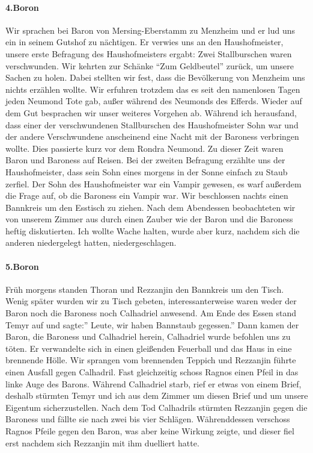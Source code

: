 \paragraph{4.Boron}
Wir sprachen bei Baron von Mersing-Eberstamm zu Menzheim und er lud uns ein in seinem Gutshof zu nächtigen. Er verwies uns an den Haushofmeister, unsere erste Befragung des Haushofmeisters ergabt: Zwei Stallburschen waren verschwunden. Wir kehrten zur Schänke ``Zum Geldbeutel'' zurück, um unsere Sachen zu holen. Dabei stellten wir fest, dass die Bevölkerung von Menzheim uns nichts erzählen wollte. Wir erfuhren trotzdem das es seit den namenlosen Tagen jeden Neumond Tote gab, außer während des Neumonds des Efferds. Wieder auf dem Gut besprachen wir unser weiteres Vorgehen ab.
Während ich herausfand, dass einer der verschwundenen Stallburschen des Haushofmeister Sohn war und der andere Verschwundene anscheinend eine Nacht mit der Baroness verbringen wollte. Dies passierte kurz vor dem Rondra Neumond. Zu dieser Zeit waren Baron und Baroness auf Reisen. Bei der zweiten Befragung erzählte uns der Haushofmeister, dass sein Sohn eines morgens in der Sonne einfach zu Staub zerfiel. Der Sohn des Haushofmeister war ein Vampir gewesen, es warf außerdem die Frage auf, ob die Baroness ein Vampir war. Wir beschlossen nachts einen Bannkreis um den Esstisch zu ziehen. Nach dem Abendessen beobachteten wir von unserem Zimmer aus durch einen Zauber wie der Baron und die Baroness heftig diskutierten. Ich wollte Wache halten, wurde aber kurz, nachdem sich die anderen niedergelegt hatten, niedergeschlagen.

\paragraph{5.Boron}
Früh morgens standen Thoran und Rezzanjin den Bannkreis um den Tisch. Wenig später wurden wir zu Tisch gebeten, interessanterweise waren weder der Baron noch die Baroness noch Calhadriel anwesend. Am Ende des Essen stand Temyr auf und sagte:'' Leute, wir haben Bannstaub gegessen.'' Dann kamen der Baron, die Baroness und Calhadriel herein, Calhadriel wurde befohlen uns zu töten. Er verwandelte sich in einen gleißenden Feuerball und das Haus in eine brennende Hölle.
Wir sprangen vom brennenden Teppich und Rezzanjin führte einen Ausfall gegen Calhadril. Fast gleichzeitig schoss Ragnos einen Pfeil in das linke Auge des Barons. Während Calhadriel starb, rief er etwas von einem Brief, deshalb stürmten Temyr und ich aus dem Zimmer um diesen Brief und um unsere Eigentum sicherzustellen. Nach dem Tod Calhadrils stürmten Rezzanjin gegen die Baroness und fällte sie nach zwei bis vier Schlägen. Währenddessen verschoss Ragnos Pfeile gegen den Baron, was aber keine Wirkung zeigte, und dieser fiel erst nachdem sich Rezzanjin mit ihm duelliert hatte.

